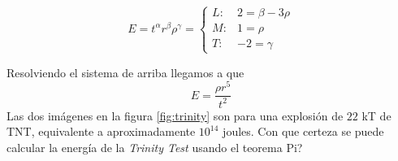 \begin{equation*}
	E = t^\alpha r^\beta \rho^\gamma = \begin{cases}
	L:& 2=\beta - 3\rho \\
	M:& 1= \rho \\
	T:& -2 = \gamma
	\end{cases}  
\end{equation*}

Resolviendo el sistema de arriba llegamos a que 
\[E = \frac{\rho r^{5}}{t^{2}} \]
Las dos imágenes en la figura \ref{fig:trinity} son para una explosión de $22$ kT de TNT, equivalente a aproximadamente $10 ^{14}$ joules. Con que certeza se puede calcular la energía de la \textit{Trinity Test} usando el teorema Pi? 






